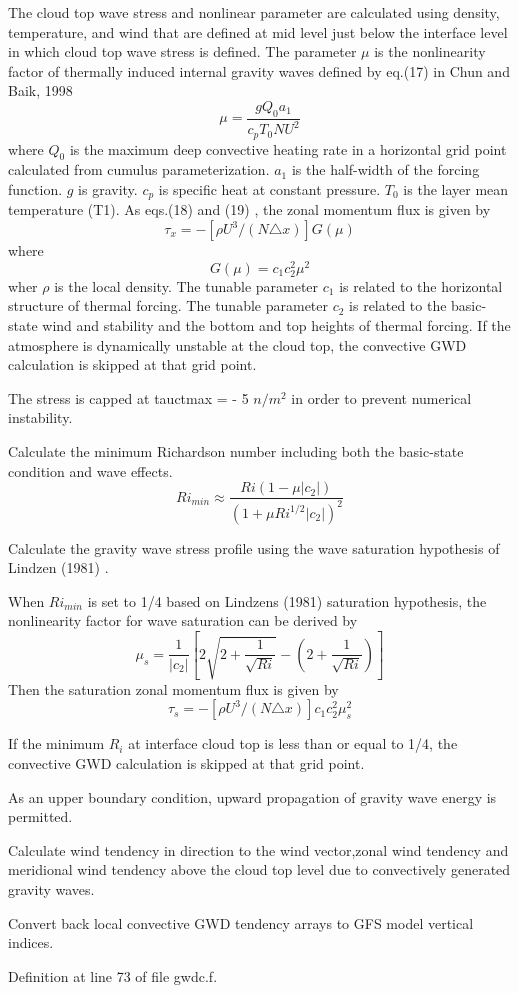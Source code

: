 \begin{DoxyEnumerate}
\begin{DoxyItemize}
\item The cloud top wave stress and nonlinear parameter are calculated using density, temperature, and wind that are defined at mid level just below the interface level in which cloud top wave stress is defined. The parameter $\mu$ is the nonlinearity factor of thermally induced internal gravity waves defined by eq.(17) in Chun and Baik, 1998 \cite{chun_and_baik_1998} \[ \mu=\frac{gQ_{0}a_{1}}{c_{p}T_{0}NU^{2}} \] where $Q_{0}$ is the maximum deep convective heating rate in a horizontal grid point calculated from cumulus parameterization. $a_{1}$ is the half-\/width of the forcing function. $g$ is gravity. $c_{p}$ is specific heat at constant pressure. $T_{0}$ is the layer mean temperature (T1). As eqs.(18) and (19) \cite{chun_and_baik_1998}, the zonal momentum flux is given by \[ \tau_{x}=-[\rho U^{3}/(N\triangle x)]G(\mu) \] where \[ G(\mu)=c_{1}c_2^2 \mu^{2} \] wher $\rho$ is the local density. The tunable parameter $c_1$ is related to the horizontal structure of thermal forcing. The tunable parameter $c_2$ is related to the basic-\/state wind and stability and the bottom and top heights of thermal forcing. If the atmosphere is dynamically unstable at the cloud top, the convective G\+WD calculation is skipped at that grid point.
\item The stress is capped at tauctmax = -\/ 5 $n/m^2$ in order to prevent numerical instability.
\end{DoxyItemize}
\item Calculate the minimum Richardson number including both the basic-\/state condition and wave effects. \[ Ri_{min}\approx\frac{Ri(1-\mu|c_{2}|)}{(1+\mu Ri^{1/2}|c_{2}|)^{2}} \]
\item Calculate the gravity wave stress profile using the wave saturation hypothesis of Lindzen (1981) \cite{lindzen_1981}.
\begin{DoxyItemize}
\item When $Ri_{min}$ is set to 1/4 based on Lindzen\textquotesingle{}s (1981) \cite{lindzen_1981} saturation hypothesis, the nonlinearity factor for wave saturation can be derived by \[ \mu_{s}=\frac{1}{|c_{2}|}[2\sqrt{2+\frac{1}{\sqrt{Ri}}}-(2+\frac{1}{\sqrt{Ri}})] \] Then the saturation zonal momentum flux is given by \[ \tau_{s}=-[\rho U^{3}/(N\triangle x)]c_{1}c_2^2\mu_s^2 \]
\item If the minimum $R_{i}$ at interface cloud top is less than or equal to 1/4, the convective G\+WD calculation is skipped at that grid point.
\item As an upper boundary condition, upward propagation of gravity wave energy is permitted.
\end{DoxyItemize}
\item Calculate wind tendency in direction to the wind vector,zonal wind tendency and meridional wind tendency above the cloud top level due to convectively generated gravity waves.
\item Convert back local convective G\+WD tendency arrays to G\+FS model vertical indices. 
\end{DoxyEnumerate}

Definition at line 73 of file gwdc.\+f.


